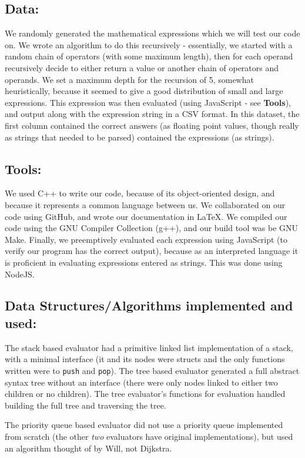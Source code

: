 \documentclass[11pt]{article}
\begin{document}
\subsection*{Data:}
We randomly generated the mathematical expressions which we will test our code on.
We wrote an algorithm to do this recursively - essentially, we started with a random chain of operators (with some maximum length), then for each operand recursively decide to either return a value or another chain of operators and operands.
We set a maximum depth for the recursion of 5, somewhat heuristically, because it seemed to give a good distribution of small and large expressions.
This expression was then evaluated (using JavaScript - see \textbf{Tools}), and output along with the expression string in a CSV format.
In this dataset, the first column contained the correct answers (as floating point values, though really as strings that needed to be parsed) contained the expressions (as strings).

\subsection*{Tools:}
We used C++ to write our code, because of its object-oriented design, and because it represents a common language between us.
We collaborated on our code using GitHub, and wrote our documentation in \LaTeX.
We compiled our code using the GNU Compiler Collection (g++), and our build tool was be GNU Make.
Finally, we preemptively evaluated each expression using JavaScript (to verify our program has the correct output), because as an interpreted language it is proficient in evaluating expressions entered as strings.
This was done using NodeJS.

\subsection*{Data Structures/Algorithms implemented and used:}
The stack based evaluator had a primitive linked list implementation of a stack, with a minimal interface (it and its nodes were structs and the only functions written were to \texttt{push} and \texttt{pop}).
The tree based evaluator generated a full abstract syntax tree without an interface (there were only nodes linked to either two children or no children).
The tree evaluator's functions for evaluation handled building the full tree and traversing the tree.

The priority queue based evaluator did not use a priority queue implemented from scratch (the other \textit{two} evaluators have original implementations), but used an algorithm thought of by Will, not Dijkstra.
\end{document}
